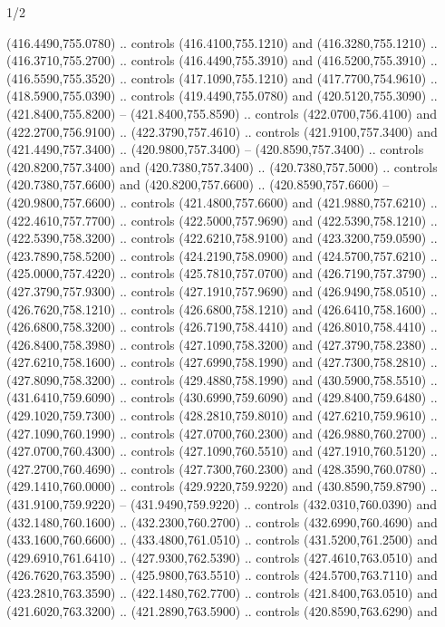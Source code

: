 \begin{flagdescription}{1/2}
\begin{scope}[xshift=0.5\flaglength]
\begin{scope}[scale=0.00745\flagwidth,xshift=-12.1mm,yshift=41.7mm]
\begin{scope}[y=0.80pt, x=0.80pt, yscale=-1, xscale=1, inner sep=0pt, outer sep=0pt]
\begin{scope}[cm={{1.33333,0.0,0.0,-1.33333,(0.0,114.66667)}}]
\begin{scope}[scale=0.100]
  (416.4490,755.0780) .. controls (416.4100,755.1210) and (416.3280,755.1210) ..
  (416.3710,755.2700) .. controls (416.4490,755.3910) and (416.5200,755.3910) ..
  (416.5590,755.3520) .. controls (417.1090,755.1210) and (417.7700,754.9610) ..
  (418.5900,755.0390) .. controls (419.4490,755.0780) and (420.5120,755.3090) ..
  (421.8400,755.8200) -- (421.8400,755.8590) .. controls (422.0700,756.4100) and
  (422.2700,756.9100) .. (422.3790,757.4610) .. controls (421.9100,757.3400) and
  (421.4490,757.3400) .. (420.9800,757.3400) -- (420.8590,757.3400) .. controls
  (420.8200,757.3400) and (420.7380,757.3400) .. (420.7380,757.5000) .. controls
  (420.7380,757.6600) and (420.8200,757.6600) .. (420.8590,757.6600) --
  (420.9800,757.6600) .. controls (421.4800,757.6600) and (421.9880,757.6210) ..
  (422.4610,757.7700) .. controls (422.5000,757.9690) and (422.5390,758.1210) ..
  (422.5390,758.3200) .. controls (422.6210,758.9100) and (423.3200,759.0590) ..
  (423.7890,758.5200) .. controls (424.2190,758.0900) and (424.5700,757.6210) ..
  (425.0000,757.4220) .. controls (425.7810,757.0700) and (426.7190,757.3790) ..
  (427.3790,757.9300) .. controls (427.1910,757.9690) and (426.9490,758.0510) ..
  (426.7620,758.1210) .. controls (426.6800,758.1210) and (426.6410,758.1600) ..
  (426.6800,758.3200) .. controls (426.7190,758.4410) and (426.8010,758.4410) ..
  (426.8400,758.3980) .. controls (427.1090,758.3200) and (427.3790,758.2380) ..
  (427.6210,758.1600) .. controls (427.6990,758.1990) and (427.7300,758.2810) ..
  (427.8090,758.3200) .. controls (429.4880,758.1990) and (430.5900,758.5510) ..
  (431.6410,759.6090) .. controls (430.6990,759.6090) and (429.8400,759.6480) ..
  (429.1020,759.7300) .. controls (428.2810,759.8010) and (427.6210,759.9610) ..
  (427.1090,760.1990) .. controls (427.0700,760.2300) and (426.9880,760.2700) ..
  (427.0700,760.4300) .. controls (427.1090,760.5510) and (427.1910,760.5120) ..
  (427.2700,760.4690) .. controls (427.7300,760.2300) and (428.3590,760.0780) ..
  (429.1410,760.0000) .. controls (429.9220,759.9220) and (430.8590,759.8790) ..
  (431.9100,759.9220) -- (431.9490,759.9220) .. controls (432.0310,760.0390) and
  (432.1480,760.1600) .. (432.2300,760.2700) .. controls (432.6990,760.4690) and
  (433.1600,760.6600) .. (433.4800,761.0510) .. controls (431.5200,761.2500) and
  (429.6910,761.6410) .. (427.9300,762.5390) .. controls (427.4610,763.0510) and
  (426.7620,763.3590) .. (425.9800,763.5510) .. controls (424.5700,763.7110) and
  (423.2810,763.3590) .. (422.1480,762.7700) .. controls (421.8400,763.0510) and
  (421.6020,763.3200) .. (421.2890,763.5900) .. controls (420.8590,763.6290) and

\end{scope}
\end{scope}
\end{scope}
\end{scope}
\end{scope}
\end{flagdescription}
